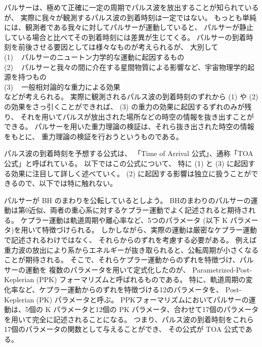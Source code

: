 パルサーは、極めて正確に一定の周期でパルス波を放出することが知られているが、
実際に我々が観測するパルス波の到着時刻は一定ではない。
もっとも単純には、観測者である我々に対してパルサーが運動していると、
パルサーが静止している場合と比べてその到着時刻には差異が生じてくる。
パルサーの到着時刻を前後させる要因としては様々なものが考えられるが、 大別して　\vspace{3pt} \\
\qquad (1) ~ パルサーのニュートン力学的な運動に起因するもの \vspace{3pt} \\
\qquad (2) ~ パルサーと我々の間に介在する星間物質による影響など、宇宙物理学的起源を持つもの \vspace{3pt} \\
\qquad (3) ~ 一般相対論的な重力による効果 
\vspace{3pt} \\
などが考えられる。
実際に観測されるパルス波の到着時刻のずれから (1) や (2) の効果をさっ引くことができれば、
(3) の重力の効果に起因するずれのみが残り、
それを用いてパルスが放出された場所などの時空の情報を抜き出すことができる。
パルサーを用いた重力理論の検証は、それら抜き出された時空の情報をもとに、
重力理論の検証を行おうというものである。

パルス波の到着時刻を予想する公式は、
「Time of Arrival 公式」、通称「TOA 公式」と呼ばれている。
以下ではこの公式について、
特に (1) と (3) に起因する効果に注目して詳しく述べていく。
(2) に起因する影響は独立に扱うことができるので、以下では特に触れない。 

パルサーが BH のまわりを公転しているとしよう。
BHのまわりのパルサーの運動は第0近似、両者の重心系に対するケプラー運動でよく記述されると期待される。
ケプラー運動は軌道周期や離心率など、5つのパラメータ (以下 K パラメータ)を用いて特徴づけられる。
しかしながら、実際の運動は厳密なケプラー運動で記述されるわけではなく、
それらからのずれを考慮する必要がある。
例えば重力波の放出により系からエネルギーが抜き取られると、公転周期が小さくなることが期待される。
そこで、それらケプラー運動からのずれを特徴づけ、パルサーの運動を
複数のパラメータを用いて定式化したのが、
Parametrized-Post-Keplerian (PPK) フォーマリズムと呼ばれるものである。
特に、軌道周期の変化率など、ケプラー運動からのずれを特徴づける12のパラメータを、
Post-Keplerian (PK) パラメータと呼ぶ。
PPKフォーマリズムにおいてパルサーの運動は、5個の K パラメータと12個の PK パラメータ、合わせて17個のパラメータを用いて完全に記述されることになる。
つまり、パルス波の到着時刻をこれら17個のパラメータの関数として与えることができ、
その公式が TOA 公式である。

